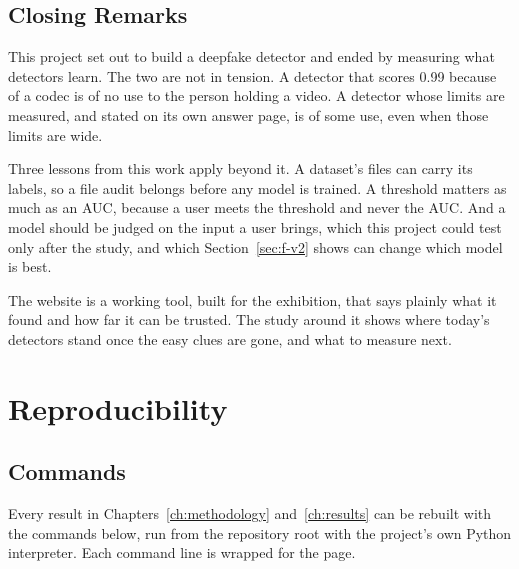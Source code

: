 \section{Closing Remarks}

This project set out to build a deepfake detector and ended by measuring
what detectors learn. The two are not in tension. A detector that scores 0.99
because of a codec is of no use to the person holding a video. A detector
whose limits are measured, and stated on its own answer page, is of some use,
even when those limits are wide.

Three lessons from this work apply beyond it. A dataset's files can carry its
labels, so a file audit belongs before any model is trained. A threshold
matters as much as an AUC, because a user meets the threshold and never the
AUC. And a model should be judged on the input a user brings, which this
project could test only after the study, and which Section~\ref{sec:f-v2}
shows can change which model is best.

The website is a working tool, built for the exhibition, that says plainly what
it found and how far it can be trusted. The study around it shows where
today's detectors stand once the easy clues are gone, and what to measure
next.

%
\appendix
\chapter{Reproducibility}
\label{app:repro}

\section{Commands}

Every result in Chapters~\ref{ch:methodology} and~\ref{ch:results} can be rebuilt with
the commands below, run from the repository root with the project's own Python
interpreter. Each command line is wrapped for the page.


